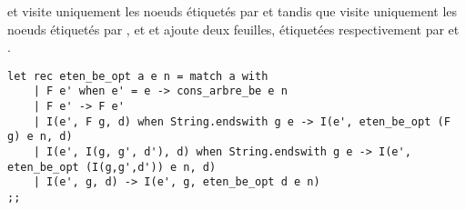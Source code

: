 \documentclass{report}
\begin{document}
\begin{exo}[Arbres]
\begin{q}{4}
\begin{q}{4.3}
             et visite uniquement les noeuds étiquetés par  et
             tandis que  visite uniquement les noeuds
            étiquetés par ,  et  et ajoute deux
            feuilles, étiquetées respectivement par  et .
            \begin{lstlisting}
let rec eten_be_opt a e n = match a with
    | F e' when e' = e -> cons_arbre_be e n
    | F e' -> F e'
    | I(e', F g, d) when String.endswith g e -> I(e', eten_be_opt (F g) e n, d)
    | I(e', I(g, g', d'), d) when String.endswith g e -> I(e', eten_be_opt (I(g,g',d')) e n, d)
    | I(e', g, d) -> I(e', g, eten_be_opt d e n)
;;          \end{lstlisting}
        \end{q}
    \end{q}
\end{exo}
\end{document}
